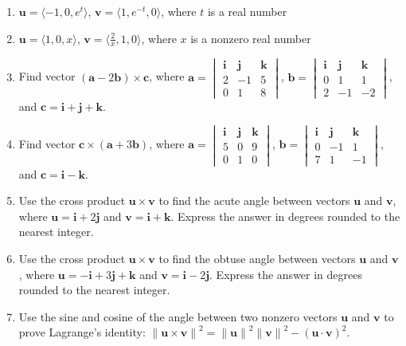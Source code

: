 \documentclass{exercises}
\begin{document}
\begin{enumerate}[resume]
\item $\mathbf{u}=\langle-1,0,e^{t}\rangle$, $\mathbf{v}=\langle1,e^{-t},0\rangle$, where $t$ is a real number
\item $\mathbf{u}=\langle1,0,x\rangle$, $\mathbf{v}=\langle \frac{2}{x},1,0\rangle$, where $x$ is a nonzero real number
\item Find vector $(\mathbf{a}-2\mathbf{b})\times \mathbf{c}$, where $\mathbf{a}=\begin{vmatrix}\mathbf{i} & \mathbf{j} & \mathbf{k} \\ 2 & -1 & 5 \\ 0 & 1 & 8\end{vmatrix}$, $\mathbf{b}=\begin{vmatrix}\mathbf{i} & \mathbf{j} & \mathbf{k} \\ 0 & 1 & 1 \\ 2 & -1 & -2\end{vmatrix}$, and $\mathbf{c}=\mathbf{i}+\mathbf{j}+\mathbf{k}$.
\item Find vector $\mathbf{c}\times (\mathbf{a}+3\mathbf{b})$, where $\mathbf{a}=\begin{vmatrix}\mathbf{i} & \mathbf{j} & \mathbf{k} \\ 5 & 0 & 9 \\ 0 & 1 & 0\end{vmatrix}$, $\mathbf{b}=\begin{vmatrix}\mathbf{i} & \mathbf{j} & \mathbf{k} \\ 0 & -1 & 1 \\ 7 & 1 & -1\end{vmatrix}$, and $\mathbf{c}=\mathbf{i}-\mathbf{k}$.
\item \techrequired Use the cross product $\mathbf{u}\times \mathbf{v}$ to find the acute angle between vectors $\mathbf{u}$ and $\mathbf{v}$, where $\mathbf{u}=\mathbf{i}+2\mathbf{j}$ and $\mathbf{v}=\mathbf{i}+\mathbf{k}$. Express the answer in degrees rounded to the nearest integer.
\item \techrequired Use the cross product $\mathbf{u}\times \mathbf{v}$ to find the obtuse angle between vectors $\mathbf{u}$ and $\mathbf{v}$, where $\mathbf{u}=-\mathbf{i}+3\mathbf{j}+\mathbf{k}$ and $\mathbf{v}=\mathbf{i}-2\mathbf{j}$. Express the answer in degrees rounded to the nearest integer.
\item Use the sine and cosine of the angle between two nonzero vectors $\mathbf{u}$ and $\mathbf{v}$ to prove Lagrange's identity: ${\|\mathbf{u}\times \mathbf{v}\|}^{2}={\|\mathbf{u}\|}^{2}{\|\mathbf{v}\|}^{2}-{(\mathbf{u}\cdot \mathbf{v})}^{2}$.

\end{enumerate}
\end{document}

